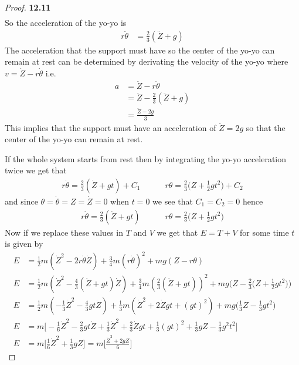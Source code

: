 \documentclass[11pt]{article}
\theoremstyle{definition}
\begin{document}
\begin{proof}{\textbf{12.11}}
\begin{align*}
    \end{align*}
    So the acceleration of the yo-yo is
    \begin{align*}
        r\ddot{\theta} &= \frac{2}{3}(\ddot{Z} + g)
    \end{align*}
    The acceleration that the support must have so the center of the
    yo-yo can remain at rest can be determined by derivating the velocity of
    the yo-yo where $v = \dot{Z} - r \dot{\theta}$ i.e. 
    \begin{align*}
        a &= \ddot{Z} - r\ddot{\theta}\\
        &= \ddot{Z} - \frac{2}{3}(\ddot{Z} + g)\\
        &= \frac{\ddot{Z} - 2g}{3}
    \end{align*}
    This implies that the support must have an acceleration of $\ddot{Z} = 2g$
    so that the center of the yo-yo can remain at rest.
    
    If the whole system starts from rest then by integrating the yo-yo
    acceleration twice we get that
    \begin{align*}
        r\dot\theta = \frac{2}{3}(\dot{Z} + gt) + C_1
        \quad\quad\quad
        r\theta = \frac{2}{3}\bigg(Z + \frac{1}{2}gt^2\bigg) + C_2
    \end{align*}
    and since $\theta = \dot\theta = Z = \dot{Z} = 0$ when $t=0$ we see that
    $C_1 = C_2 = 0$ hence
    \begin{align*}
        r\dot\theta = \frac{2}{3}(\dot{Z} + gt)
        \quad\quad\quad
        r\theta = \frac{2}{3}\bigg(Z + \frac{1}{2}gt^2\bigg)
    \end{align*}
    Now if we replace these values in $T$ and $V$ we get that $E = T + V$ for
    some time $t$ is given by
    \begin{align*}
        E &= \frac{1}{2}m(\dot{Z}^2 - 2r\dot{\theta}\dot{Z})
        + \frac{3}{4}m(r\dot{\theta})^2 + mg(Z - r\theta)\\
        E &= \frac{1}{2}m(\dot{Z}^2 - \frac{4}{3}(\dot{Z} + gt)\dot{Z})
        + \frac{3}{4}m(\frac{2}{3}(\dot{Z} + gt))^2
        + mg\bigg(Z - \frac{2}{3}\bigg(Z + \frac{1}{2}gt^2\bigg)\bigg)\\
        E &= \frac{1}{2}m(-\frac{1}{3}\dot{Z}^2 - \frac{4}{3}gt\dot{Z})
        + \frac{1}{3}m(\dot{Z}^2 + 2\dot{Z}gt + (gt)^2)
        + mg\bigg(\frac{1}{3}Z - \frac{1}{3}gt^2\bigg)\\
        E &= m\bigg[-\frac{1}{6}\dot{Z}^2 - \frac{2}{3}gt\dot{Z}
        + \frac{1}{3}\dot{Z}^2 + \frac{2}{3}\dot{Z}gt + \frac{1}{3}(gt)^2
        + \frac{1}{3}gZ - \frac{1}{3}g^2t^2\bigg]\\
        E &= m\bigg[\frac{1}{6}\dot{Z}^2
        + \frac{1}{3}gZ\bigg] = m \bigg[\frac{\dot{Z}^2 + 2gZ}{6}\bigg]
    \end{align*}




\end{proof}
\end{document}
